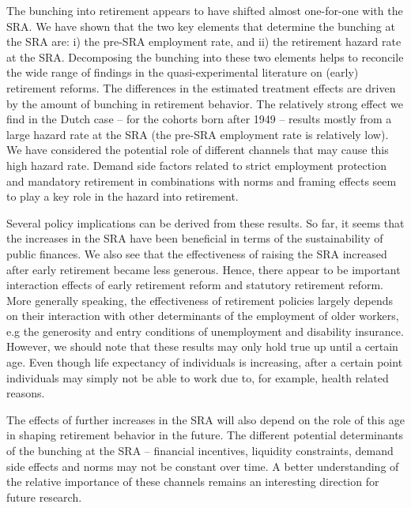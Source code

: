 \documentclass[12pt,a4paper]{article}
\begin{document}
The bunching into retirement appears to have shifted almost one-for-one with the SRA. We have shown that the two key elements that determine the bunching at the SRA are: i) the pre-SRA employment rate, and ii) the retirement hazard rate at the SRA. Decomposing the bunching into these two elements helps to reconcile the wide range of findings in the quasi-experimental literature on (early) retirement reforms. The differences in the estimated treatment effects are driven by the amount of bunching in retirement behavior. The relatively strong effect we find in the Dutch case -- for the cohorts born after 1949 -- results mostly from a large hazard rate at the SRA (the pre-SRA employment rate is relatively low). We have considered the potential role of different channels that may cause this high hazard rate. Demand side factors related to strict employment protection and mandatory retirement in combinations with norms and framing effects seem to play a key role in the hazard into retirement.   

Several policy implications can be derived from these results. So far, it seems that the increases in the SRA have been beneficial in terms of the sustainability of public finances. We also see that the effectiveness of raising the SRA increased after early retirement became less generous. Hence, there appear to be important interaction effects of early retirement reform and statutory retirement reform. More generally speaking, the effectiveness of retirement policies largely depends on their interaction with other determinants of the employment of older workers, e.g the generosity and entry conditions of unemployment and disability insurance.  However, we should note that these results may only hold true up until a certain age. Even though life expectancy of individuals is increasing, after a certain point individuals may simply not be able to work due to, for example, health related reasons. 

The effects of further increases in the SRA will also depend on the role of this age in shaping retirement behavior in the future. The different potential determinants of the bunching at the SRA -- financial incentives, liquidity constraints, demand side effects and norms may not be constant over time. A better understanding of the relative importance of these channels remains an interesting direction for future research. 


%

\newpage
\appendix
\end{document}

